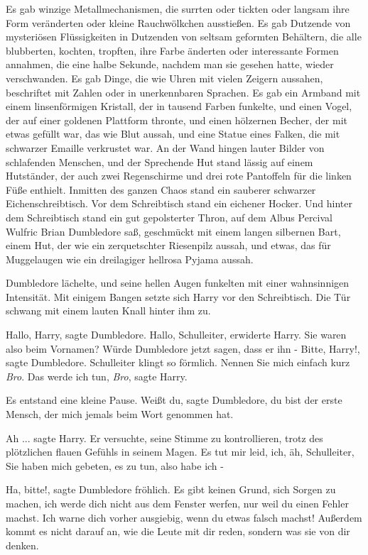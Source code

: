 Es gab winzige Metallmechanismen, die surrten oder tickten oder langsam ihre
Form veränderten oder kleine Rauchwölkchen ausstießen. Es gab Dutzende von
mysteriösen Flüssigkeiten in Dutzenden von seltsam geformten Behältern, die alle
blubberten, kochten, tropften, ihre Farbe änderten oder interessante Formen
annahmen, die eine halbe Sekunde, nachdem man sie gesehen hatte, wieder
verschwanden. Es gab Dinge, die wie Uhren mit vielen Zeigern aussahen,
beschriftet mit Zahlen oder in unerkennbaren Sprachen. Es gab ein Armband mit
einem linsenförmigen Kristall, der in tausend Farben funkelte, und einen Vogel,
der auf einer goldenen Plattform thronte, und einen hölzernen Becher, der mit
etwas gefüllt war, das wie Blut aussah, und eine Statue eines Falken, die mit
schwarzer Emaille verkrustet war. An der Wand hingen lauter Bilder von
schlafenden Menschen, und der Sprechende Hut stand lässig auf einem Hutständer,
der auch zwei Regenschirme und drei rote Pantoffeln für die linken Füße
enthielt. Inmitten des ganzen Chaos stand ein sauberer schwarzer
Eichenschreibtisch. Vor dem Schreibtisch stand ein eichener Hocker. Und hinter
dem Schreibtisch stand ein gut gepolsterter Thron, auf dem Albus Percival
Wulfric Brian Dumbledore saß, geschmückt mit einem langen silbernen Bart, einem
Hut, der wie ein zerquetschter Riesenpilz aussah, und etwas, das für Muggelaugen
wie ein dreilagiger hellrosa Pyjama aussah.

Dumbledore lächelte, und seine hellen Augen funkelten mit einer wahnsinnigen
Intensität. Mit einigem Bangen setzte sich Harry vor den Schreibtisch. Die Tür
schwang mit einem lauten Knall hinter ihm zu.

\glqq Hallo, Harry\grqq{}, sagte Dumbledore. \glqq Hallo, Schulleiter\grqq{},
erwiderte Harry. Sie waren also beim Vornamen? Würde Dumbledore jetzt sagen,
dass er ihn - \glqq Bitte, Harry!\grqq{}, sagte Dumbledore. \glqq Schulleiter
klingt so förmlich. Nennen Sie mich einfach kurz \emph{Bro}.\grqq{} \glqq Das
werde ich tun, \emph{Bro}\grqq{}, sagte Harry.

Es entstand eine kleine Pause. \glqq Weißt du\grqq{}, sagte Dumbledore, \glqq du
bist der erste Mensch, der mich jemals beim Wort genommen hat.\grqq{}

\glqq Ah ...\grqq{} sagte Harry. Er versuchte, seine Stimme zu kontrollieren,
trotz des plötzlichen flauen Gefühls in seinem Magen. \glqq Es tut mir leid,
ich, äh, Schulleiter, Sie haben mich gebeten, es zu tun, also habe ich -\grqq{}

\glqq Ha, bitte!\grqq{}, sagte Dumbledore fröhlich. \glqq Es gibt keinen Grund,
sich Sorgen zu machen, ich werde dich nicht aus dem Fenster werfen, nur weil du
einen Fehler machst. Ich warne dich vorher ausgiebig, wenn du etwas falsch
machst! Außerdem kommt es nicht darauf an, wie die Leute mit dir reden, sondern
was sie von dir denken.\grqq{}

